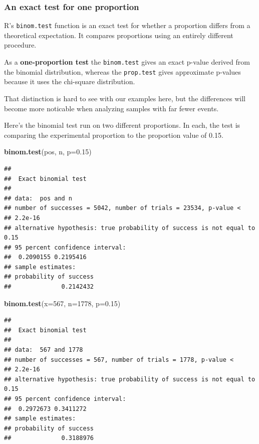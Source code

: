 \documentclass[]{book}
\newenvironment{Shaded}{\begin{snugshade}}{\end{snugshade}}
\newcommand{\DataTypeTok}[1]{\textcolor[rgb]{0.13,0.29,0.53}{#1}}
\newcommand{\DecValTok}[1]{\textcolor[rgb]{0.00,0.00,0.81}{#1}}
\newcommand{\FloatTok}[1]{\textcolor[rgb]{0.00,0.00,0.81}{#1}}
\newcommand{\KeywordTok}[1]{\textcolor[rgb]{0.13,0.29,0.53}{\textbf{#1}}}
\newcommand{\NormalTok}[1]{#1}
\begin{document}
\hypertarget{an-exact-test-for-one-proportion}{%
\subsubsection{An exact test for one proportion}\label{an-exact-test-for-one-proportion}}

R's \texttt{binom.test} function is an exact test for whether a proportion differs from a theoretical expectation. It compares proportions using an entirely different procedure.

As a \textbf{one-proportion test} the \texttt{binom.test} gives an exact p-value derived from the binomial distribution, whereas the \texttt{prop.test} gives approximate p-values because it uses the chi-square distribution.

That distinction is hard to see with our examples here, but the differences will become more noticable when analyzing samples with far fewer events.

Here's the binomial test run on two different proportions. In each, the test is comparing the experimental proportion to the proportion value of 0.15.

\begin{Shaded}
\begin{Highlighting}[]
\KeywordTok{binom.test}\NormalTok{(pos, n, }\DataTypeTok{p=}\FloatTok{0.15}\NormalTok{)}
\end{Highlighting}
\end{Shaded}

\begin{verbatim}
## 
##  Exact binomial test
## 
## data:  pos and n
## number of successes = 5042, number of trials = 23534, p-value <
## 2.2e-16
## alternative hypothesis: true probability of success is not equal to 0.15
## 95 percent confidence interval:
##  0.2090155 0.2195416
## sample estimates:
## probability of success 
##              0.2142432
\end{verbatim}

\begin{Shaded}
\begin{Highlighting}[]
\KeywordTok{binom.test}\NormalTok{(}\DataTypeTok{x=}\DecValTok{567}\NormalTok{, }\DataTypeTok{n=}\DecValTok{1778}\NormalTok{, }\DataTypeTok{p=}\FloatTok{0.15}\NormalTok{)}
\end{Highlighting}
\end{Shaded}

\begin{verbatim}
## 
##  Exact binomial test
## 
## data:  567 and 1778
## number of successes = 567, number of trials = 1778, p-value <
## 2.2e-16
## alternative hypothesis: true probability of success is not equal to 0.15
## 95 percent confidence interval:
##  0.2972673 0.3411272
## sample estimates:
## probability of success 
##              0.3188976
\end{verbatim}
\end{document}
